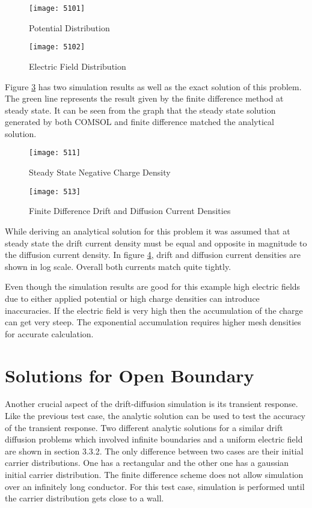 \begin{doublespace}
\begin{figure}
\centering
\texttt{[image: 5101]}
\caption{Potential Distribution} 
\label{5pot}
\end{figure}

\begin{figure}
\centering
\texttt{[image: 5102]}
\caption{Electric Field Distribution} 
\label{5E}
\end{figure}

\clearpage

Figure  \ref{5ss} has two simulation results as well as the exact solution of this problem. The green line represents the result given by the finite difference method at steady state. It can be seen from the graph that the steady state solution generated by both COMSOL and finite difference matched the analytical solution.

\begin{figure}
\centering
\texttt{[image: 511]}
\caption{Steady State Negative Charge Density} 
\label{5ss}
\end{figure}

\begin{figure}[!htp]
\centering
\texttt{[image: 513]}
\caption{Finite Difference Drift and Diffusion Current Densities}
 \label{5curdens}
\end{figure}

While deriving an analytical solution for this problem it was assumed that at steady state the drift current density must be equal and opposite in magnitude to the diffusion current density. In figure \ref{5curdens}, drift and diffusion current densities are shown in log scale. Overall both currents match quite tightly.

Even though the simulation results are good for this example high electric fields due to either applied potential or high charge densities can introduce inaccuracies. If the electric field is very high then the accumulation of the charge can get very steep. The exponential accumulation requires higher mesh densities for accurate calculation.

\clearpage
\section{Solutions for Open Boundary}
Another crucial aspect of the drift-diffusion simulation is its transient response. Like the previous test case, the analytic solution can be used to test the accuracy of the transient response. Two different analytic solutions for a similar drift diffusion problems which involved infinite boundaries and a uniform electric field are shown in section 3.3.2. The only difference between two cases are their initial carrier distributions. One has a rectangular and the other one has a gaussian initial carrier distribution. The finite difference scheme does not allow simulation over an infinitely long conductor. For this test case, simulation is performed until the carrier distribution gets close to a wall.   


\end{doublespace}
